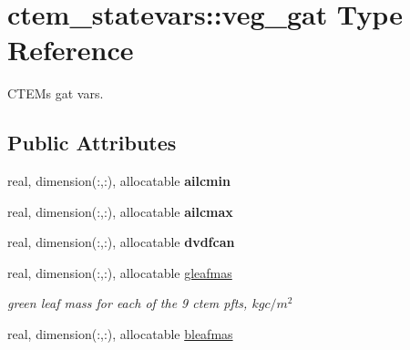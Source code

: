\hypertarget{structctem__statevars_1_1veg__gat}{}\section{ctem\+\_\+statevars\+:\+:veg\+\_\+gat Type Reference}
\label{structctem__statevars_1_1veg__gat}


C\+T\+E\+M\textquotesingle{}s \textquotesingle{}gat\textquotesingle{} vars.  


\subsection*{Public Attributes}
\begin{DoxyCompactItemize}
\item 
\hypertarget{structctem__statevars_1_1veg__gat_a9c93444724cdfdd9855bf3b9258df9c2}{}real, dimension(\+:,\+:), allocatable {\bfseries ailcmin}\label{structctem__statevars_1_1veg__gat_a9c93444724cdfdd9855bf3b9258df9c2}

\item 
\hypertarget{structctem__statevars_1_1veg__gat_aa36214d9c1d4f3afa6a47c4b2aaad4f0}{}real, dimension(\+:,\+:), allocatable {\bfseries ailcmax}\label{structctem__statevars_1_1veg__gat_aa36214d9c1d4f3afa6a47c4b2aaad4f0}

\item 
\hypertarget{structctem__statevars_1_1veg__gat_a39cfb7d9118f5871dc60af5d703e031c}{}real, dimension(\+:,\+:), allocatable {\bfseries dvdfcan}\label{structctem__statevars_1_1veg__gat_a39cfb7d9118f5871dc60af5d703e031c}

\item 
\hypertarget{structctem__statevars_1_1veg__gat_a44073d053264531b571e6a59abd081df}{}real, dimension(\+:,\+:), allocatable \hyperlink{structctem__statevars_1_1veg__gat_a44073d053264531b571e6a59abd081df}{gleafmas}\label{structctem__statevars_1_1veg__gat_a44073d053264531b571e6a59abd081df}

\begin{DoxyCompactList}\small\item\em green leaf mass for each of the 9 ctem pfts, $kg c/m^2$ \end{DoxyCompactList}\item 
\hypertarget{structctem__statevars_1_1veg__gat_a0adf3e8544766c0c2b1aa5bf5a35f166}{}real, dimension(\+:,\+:), allocatable \hyperlink{structctem__statevars_1_1veg__gat_a0adf3e8544766c0c2b1aa5bf5a35f166}{bleafmas}\label{structctem__statevars_1_1veg__gat_a0adf3e8544766c0c2b1aa5bf5a35f166}


\end{DoxyCompactItemize}
